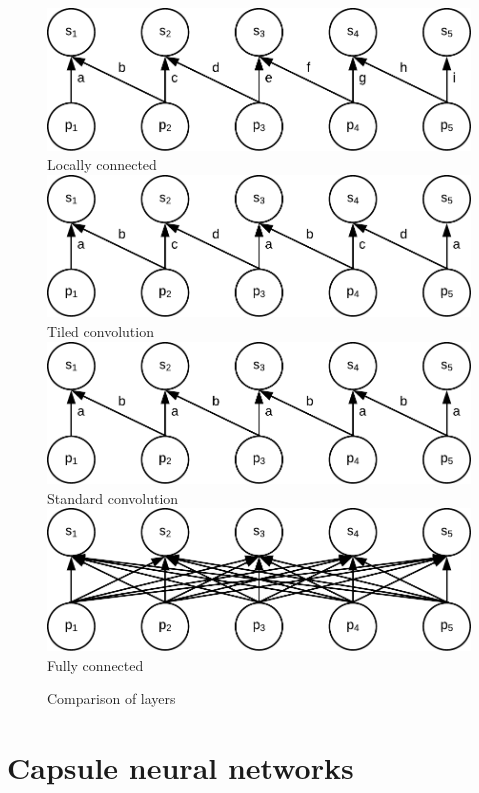 \begin{figure}
    \centering
    \includegraphics[width=.6\textwidth]{obrazky-figures/locally_connected.pdf} \\
    Locally connected \\
    \bigskip
    \includegraphics[width=.6\textwidth]{obrazky-figures/convolution_tiled.pdf} \\
    Tiled convolution \\
    \bigskip
    \includegraphics[width=.6\textwidth]{obrazky-figures/convolution_std.pdf} \\
    Standard convolution \\
    \bigskip
    \includegraphics[width=.6\textwidth]{obrazky-figures/fully_connected.pdf} \\
    Fully connected \\
    \bigskip
    \caption{Comparison of layers}
\end{figure}

\section{Capsule neural networks}



